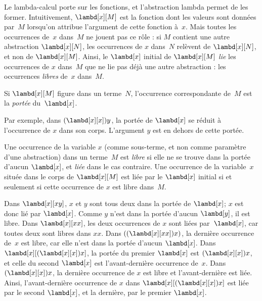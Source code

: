 \documentclass[../../../include/open-logic-section]{subfiles}
\begin{document}

Le lambda-calcul porte sur les fonctions,
et l'abstraction lambda permet de les former.
Intuitivement, $\lambd[x][M]$ est la fonction
dont les valeurs sont données par~$M$ lorsqu'on
attribue l'argument de cette fonction à~$x$.
Mais toutes les occurrences de~$x$ dans~$M$
ne jouent pas ce rôle : si $M$ contient une autre
abstraction $\lambd[x][N]$, les occurrences de $x$
dans~$N$ relèvent de $\lambd[x][N]$, et non de
$\lambd[x][M]$. Ainsi, le $\lambd[x]$ initial de
$\lambd[x][M]$ \emph{lie} les occurrences de $x$
dans~$M$ que ne lie pas déjà une autre
abstraction : les occurrences \emph{libres}
de~$x$ dans~$M$.

\begin{defn}[Portée]
Si $\lambd[x][M]$ figure dans un terme~$N$,
l'occurrence correspondante de~$M$ est la
\emph{portée} du~$\lambd[x]$.
\end{defn}

Par exemple, dans $(\lambd[x][x])y$, la portée de
$\lambd[x]$ se réduit à l'occurrence de $x$ dans
son corps. L'argument $y$ est en dehors de cette portée.

\begin{defn}
Une occurrence de la variable $x$ (comme sous-terme, et non comme paramètre d'une abstraction) dans un
terme~$M$ est \emph{libre} si elle ne se trouve
dans la portée d'aucun $\lambd[x]$, et
\emph{liée} dans le cas contraire. Une occurrence
de la variable~$x$ située dans le corps de
$\lambd[x][M]$ est liée par le $\lambd[x]$
initial si et seulement si cette occurrence de
$x$ est libre dans~$M$.
\end{defn}

\begin{ex}
Dans $\lambd[x][x y]$, $x$ et $y$ sont tous
deux dans la portée de $\lambd[x]$; $x$ est
donc lié par $\lambd[x]$. Comme $y$ n'est
dans la portée d'aucun $\lambd[y]$, il est
libre. Dans $\lambd[x][x x]$, les deux
occurrences de $x$ sont liées par~$\lambd[x]$,
car toutes deux sont libres dans $xx$. Dans
$((\lambd[x][xx])x)$, la dernière occurrence
de~$x$ est libre, car elle n'est dans la portée
d'aucun $\lambd[x]$. Dans
$\lambd[x][(\lambd[x][x])x]$, la portée du
premier $\lambd[x]$ est $(\lambd[x][x])x$,
et celle du second $\lambd[x]$ est
l'avant-dernière occurrence de~$x$. Dans
$(\lambd[x][x])x$, la dernière occurrence de
$x$ est libre et l'avant-dernière est liée.
Ainsi, l'avant-dernière occurrence de $x$
dans $\lambd[x][(\lambd[x][x])x]$ est liée
par le second $\lambd[x]$, et la dernière,
par le premier $\lambd[x]$.
\end{ex}
\end{document}
